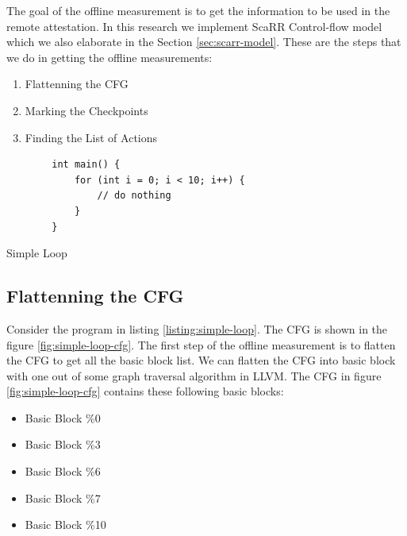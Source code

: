 The goal of the offline measurement is to get the information to be used in the 
remote attestation. In this research we implement ScaRR Control-flow model 
\cite{toffaliniScaRRScalableRuntime2019} which we also elaborate in the Section 
\ref{sec:scarr-model}. These are the steps that we do in getting the offline 
measurements:


\begin{enumerate}
    \item Flattenning the CFG
    \item Marking the Checkpoints
    \item Finding the List of Actions
\end{enumerate}

\begin{listing}[htbp]
    \begin{verbatim}
        int main() {
            for (int i = 0; i < 10; i++) {
                // do nothing
            }
        }
    \end{verbatim}
    \caption{Simple Loop}    
    \label{listing:simple-loop}
\end{listing}

\subsection{Flattenning the CFG}


Consider the program in listing \ref{listing:simple-loop}. The CFG is shown in the figure \ref{fig:simple-loop-cfg}. The first step of the offline measurement is to flatten the CFG to get all the basic block list. We can flatten the CFG into basic block with one out of some graph traversal algorithm in LLVM. The CFG in figure \ref{fig:simple-loop-cfg} contains these following basic blocks:

\begin{itemize}
    \item Basic Block \%0
    \item Basic Block \%3
    \item Basic Block \%6
    \item Basic Block \%7
    \item Basic Block \%10
\end{itemize}


